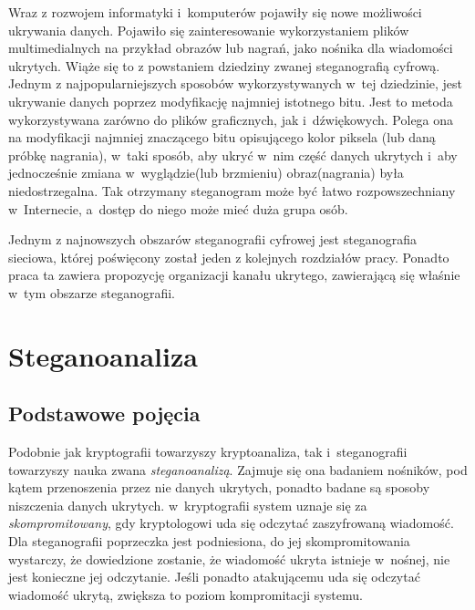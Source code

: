 \documentclass[a4paper, twoside, 12pt]{report}
\begin{document}
        Wraz z rozwojem informatyki i~komputerów pojawiły się nowe możliwości
        ukrywania danych. Pojawiło się zainteresowanie wykorzystaniem plików
        multimedialnych na przykład obrazów lub nagrań, jako nośnika dla wiadomości
        ukrytych. Wiąże się to z powstaniem dziedziny zwanej steganografią cyfrową.
        Jednym z najpopularniejszych sposobów wykorzystywanych w~tej dziedzinie,
        jest ukrywanie danych poprzez modyfikację najmniej istotnego bitu. Jest
        to metoda wykorzystywana zarówno do plików graficznych\cite{LSBSTEGANGRAPHY},
        jak i~dźwiękowych\cite{AUDIOLSBSTEGANGRAPHY}.
        Polega ona na modyfikacji najmniej znaczącego bitu opisującego kolor piksela
        (lub daną próbkę nagrania), w~taki sposób, aby ukryć w~nim część danych
        ukrytych i~aby jednocześnie zmiana w~wyglądzie(lub brzmieniu) obraz(nagrania)
        była niedostrzegalna. Tak otrzymany steganogram może być łatwo rozpowszechniany
        w~Internecie, a~dostęp do niego może mieć duża grupa osób.

        Jednym z najnowszych obszarów steganografii cyfrowej jest steganografia
        sieciowa, której poświęcony został jeden z kolejnych rozdziałów pracy.
        Ponadto praca ta zawiera propozycję organizacji kanału ukrytego, zawierającą
        się właśnie w~tym obszarze steganografii.

    \section{Steganoanaliza}
        \subsection{Podstawowe pojęcia}
        Podobnie jak kryptografii towarzyszy kryptoanaliza, tak i~steganografii
        towarzyszy nauka zwana \emph{steganoanalizą}. Zajmuje się ona badaniem
        nośników, pod kątem przenoszenia przez nie danych ukrytych, ponadto badane
        są sposoby niszczenia danych ukrytych. w~kryptografii system uznaje się
        za \emph{skompromitowany}, gdy kryptologowi uda się odczytać zaszyfrowaną wiadomość.
        Dla steganografii poprzeczka jest podniesiona, do jej skompromitowania wystarczy,
        że dowiedzione zostanie, że wiadomość ukryta istnieje w~nośnej, nie jest
        konieczne jej odczytanie. Jeśli ponadto atakującemu uda się odczytać wiadomość
        ukrytą, zwiększa to poziom kompromitacji systemu.
\end{document}
